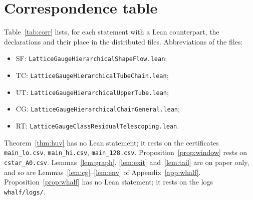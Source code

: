 \documentclass[11pt,a4paper]{article}
\theoremstyle{definition}
\theoremstyle{remark}
\newcommand{\code}[1]{\texttt{#1}}
\begin{document}
\section{Correspondence table}\label{sec:corr}
Table~\ref{tab:corr} lists, for each statement with a Lean counterpart, the declarations and their place in the distributed files.
Abbreviations of the files:
\begin{itemize}[nosep]
\item SF: \code{LatticeGaugeHierarchicalShapeFlow.lean};
\item TC: \code{LatticeGaugeHierarchicalTubeChain.lean};
\item UT: \code{LatticeGaugeHierarchicalUpperTube.lean};
\item CG: \code{LatticeGaugeHierarchicalChainGeneral.lean};
\item RT: \code{LatticeGaugeClassResidualTelescoping.lean}.
\end{itemize}
Theorem~\ref{thm:huv} has no Lean statement; it rests on the certificates \code{main\_lo.csv}, \code{main\_hi.csv}, \code{main\_128.csv}.
Proposition~\ref{prop:window} rests on \code{cstar\_A0.csv}.
Lemmas~\ref{lem:graph}, \ref{lem:exit} and~\ref{lem:tail} are on paper only, and so are Lemmas~\ref{lem:cg}--\ref{lem:env} of Appendix~\ref{app:whalf}. Proposition~\ref{prop:whalf} has no Lean statement; it rests on the logs \code{whalf/logs/}.
\end{document}
